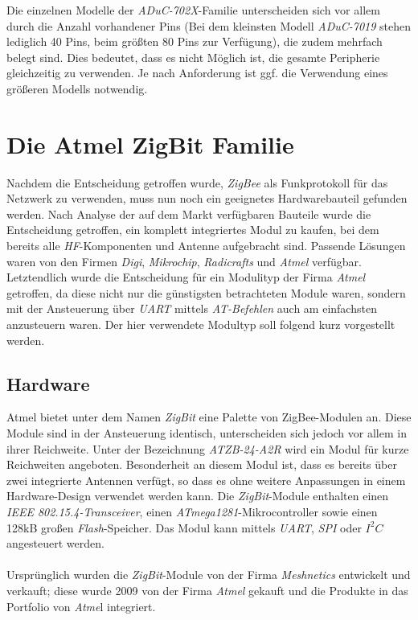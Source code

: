         Die einzelnen Modelle der \emph{ADuC-702X}-Familie unterscheiden sich vor allem durch die Anzahl vorhandener 
        Pins (Bei dem kleinsten Modell \emph{ADuC-7019} stehen lediglich 40 Pins, beim größten 80 Pins zur Verfügung), 
        die zudem mehrfach belegt sind. Dies bedeutet, dass es nicht Möglich ist, die gesamte Peripherie gleichzeitig zu 
        verwenden. Je nach Anforderung ist ggf. die Verwendung eines größeren Modells notwendig. 


\section{Die Atmel ZigBit Familie}

    Nachdem die Entscheidung getroffen wurde, \emph{ZigBee} als Funkprotokoll für das Netzwerk zu verwenden, muss
    nun noch ein geeignetes Hardwarebauteil gefunden werden. Nach Analyse der auf dem Markt verfügbaren Bauteile
    wurde die Entscheidung getroffen, ein komplett integriertes Modul zu kaufen, bei dem bereits alle 
    \emph{HF}-Komponenten und Antenne aufgebracht sind. Passende Lösungen waren von den Firmen \emph{Digi}, 
    \emph{Mikrochip}, \emph{Radicrafts} und \emph{Atmel} verfügbar. Letztendlich wurde die Entscheidung für
    ein Modulityp der Firma \emph{Atmel} getroffen, da diese nicht nur die günstigsten betrachteten Module waren,
    sondern mit der Ansteuerung über \emph{UART} mittels \emph{AT-Befehlen} auch am einfachsten anzusteuern waren.
    Der hier verwendete Modultyp soll folgend kurz vorgestellt werden.

    \subsection{Hardware}

        Atmel bietet unter dem Namen \emph{ZigBit} eine Palette von ZigBee-Modulen an. Diese Module sind in der
        Ansteuerung identisch, unterscheiden sich jedoch vor allem in ihrer Reichweite. Unter der Bezeichnung 
        \emph{ATZB-24-A2R} wird ein Modul für kurze Reichweiten angeboten. Besonderheit an diesem Modul ist, 
        dass es bereits über zwei integrierte Antennen verfügt, so dass es ohne weitere Anpassungen in einem 
        Hardware-Design verwendet werden kann.
        Die \emph{ZigBit}-Module enthalten einen \emph{IEEE 802.15.4-Transceiver}, einen 
        \emph{ATmega1281}-Mikrocontroller sowie einen
        128kB großen \emph{Flash}-Speicher. Das Modul kann mittels \emph{UART}, \emph{SPI} oder \emph{$I^2C$} angesteuert 
        werden.\\
        \\
        Ursprünglich wurden die \emph{ZigBit}-Module von der Firma \emph{Meshnetics} entwickelt und verkauft; diese wurde 
        2009 von der Firma \emph{Atmel} gekauft und die Produkte in das Portfolio von \emph{Atme}l integriert.

